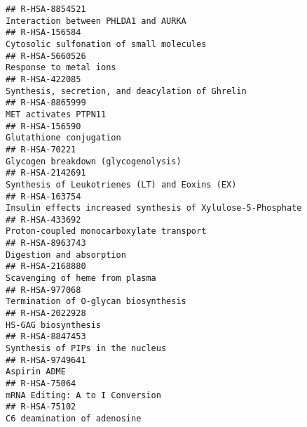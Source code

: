\documentclass[
]{article}
\begin{document}
\begin{verbatim}
## R-HSA-8854521                                                                                                 Interaction between PHLDA1 and AURKA
## R-HSA-156584                                                                                              Cytosolic sulfonation of small molecules
## R-HSA-5660526                                                                                                               Response to metal ions
## R-HSA-422085                                                                                      Synthesis, secretion, and deacylation of Ghrelin
## R-HSA-8865999                                                                                                                 MET activates PTPN11
## R-HSA-156590                                                                                                               Glutathione conjugation
## R-HSA-70221                                                                                                    Glycogen breakdown (glycogenolysis)
## R-HSA-2142691                                                                                       Synthesis of Leukotrienes (LT) and Eoxins (EX)
## R-HSA-163754                                                                           Insulin effects increased synthesis of Xylulose-5-Phosphate
## R-HSA-433692                                                                                              Proton-coupled monocarboxylate transport
## R-HSA-8963743                                                                                                             Digestion and absorption
## R-HSA-2168880                                                                                                       Scavenging of heme from plasma
## R-HSA-977068                                                                                                  Termination of O-glycan biosynthesis
## R-HSA-2022928                                                                                                                  HS-GAG biosynthesis
## R-HSA-8847453                                                                                                     Synthesis of PIPs in the nucleus
## R-HSA-9749641                                                                                                                         Aspirin ADME
## R-HSA-75064                                                                                                        mRNA Editing: A to I Conversion
## R-HSA-75102                                                                                                            C6 deamination of adenosine

\end{verbatim}
\end{document}
